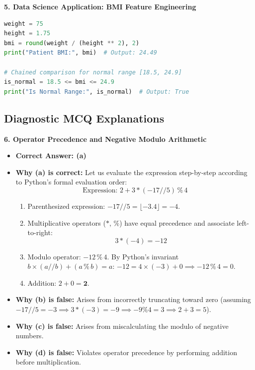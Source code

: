 \textbf{5. Data Science Application: BMI Feature Engineering}
\begin{lstlisting}[language=Python]
weight = 75
height = 1.75
bmi = round(weight / (height ** 2), 2)
print("Patient BMI:", bmi)  # Output: 24.49

# Chained comparison for normal range [18.5, 24.9]
is_normal = 18.5 <= bmi <= 24.9
print("Is Normal Range:", is_normal)  # Output: True
\end{lstlisting}

\subsection*{Diagnostic MCQ Explanations}

\textbf{6. Operator Precedence and Negative Modulo Arithmetic}
\begin{itemize}
    \item \textbf{Correct Answer: (a)}
    \item \textbf{Why (a) is correct:}
    Let us evaluate the expression step-by-step according to Python's formal evaluation order:
    \begin{equation*}
    \text{Expression: } 2 + 3 * (-17 \mathbin{/\!\!/} 5) \mathbin{\%} 4
    \end{equation*}
    \begin{enumerate}
        \item Parenthesized expression: $-17 \mathbin{/\!\!/} 5 = \lfloor -3.4 \rfloor = -4$.
        \item Multiplicative operators ($*$, $\%$) have equal precedence and associate left-to-right:
        \begin{equation*}
        3 * (-4) = -12
        \end{equation*}
        \item Modulo operator: $-12 \mathbin{\%} 4$.
        By Python's invariant $b \times (a \mathbin{/\!\!/} b) + (a \mathbin{\%} b) = a$:
        $-12 = 4 \times (-3) + 0 \implies -12 \mathbin{\%} 4 = 0$.
        \item Addition: $2 + 0 = \mathbf{2}$.
    \end{enumerate}
    \item \textbf{Why (b) is false:} Arises from incorrectly truncating toward zero (assuming $-17 // 5 = -3 \implies 3 * (-3) = -9 \implies -9 \% 4 = 3 \implies 2 + 3 = 5$).
    \item \textbf{Why (c) is false:} Arises from miscalculating the modulo of negative numbers.
    \item \textbf{Why (d) is false:} Violates operator precedence by performing addition before multiplication.
\end{itemize}

